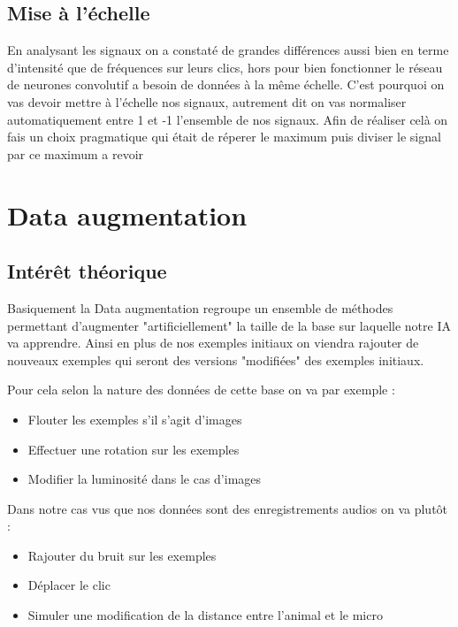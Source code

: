 \hypertarget{Mise-a-l-echelle}{%
\subsection{Mise à l'échelle}
\label{Mise-a-l-echelle}}

En analysant les signaux on a constaté de grandes différences aussi bien en terme d'intensité que de fréquences sur leurs clics, hors pour bien fonctionner le réseau de neurones convolutif a besoin de données à la même échelle. C'est pourquoi on vas devoir mettre à l'échelle nos signaux, autrement dit on vas normaliser automatiquement entre 1 et -1 l'ensemble de nos signaux.
Afin de réaliser celà on fais un choix pragmatique qui était de réperer le maximum puis diviser le signal par ce maximum
\comment a revoir

\hypertarget{Data-augmentation}{%
\section{Data augmentation}
\label{Data-augmentation}}

\hypertarget{}{%
\subsection{Intérêt théorique}
\label{interets_theoriques}}

Basiquement la Data augmentation regroupe un ensemble de méthodes permettant d'augmenter "artificiellement" la taille de la base sur laquelle notre IA va apprendre. Ainsi en plus de nos exemples initiaux on viendra rajouter de nouveaux exemples qui seront des versions "modifiées" des exemples initiaux.

Pour cela selon la nature des données de cette base on va par exemple :
\begin{itemize}
\item Flouter les exemples s'il s'agit d'images
\item Effectuer une rotation sur les exemples
\item Modifier la luminosité dans le cas d'images
\end{itemize}

Dans notre cas vus que nos données sont des enregistrements audios on va plutôt :
\begin{itemize}
\item Rajouter du bruit sur les exemples
\item Déplacer le clic
\item Simuler une modification de la distance entre l'animal et le micro
\end{itemize}

